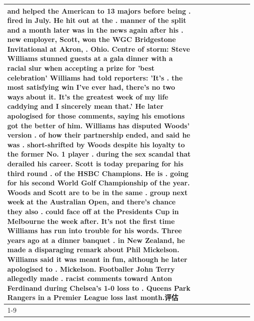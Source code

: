 \begin{table}[H]
\begin{tabular}{lllrlllll}
and helped the American to 13 majors before being . fired in July. He hit out at the . manner of the split and a month later was in the news again after his . new employer, Scott, won the WGC Bridgestone Invitational at Akron, . Ohio. Centre of storm: Steve Williams stunned guests at a gala dinner with a racial slur when accepting a prize for 'best celebration' Williams had told reporters: 'It's . the most satisfying win I've ever had, there's no two ways about it. It's the greatest week of my life caddying and I sincerely mean that.' He later apologised for those comments, saying his emotions got the better of him. Williams has disputed Woods' version . of how their partnership ended, and said he was . short-shrifted by Woods despite his loyalty to the former No. 1 player . during the sex scandal that derailed his career. Scott is today preparing for his third round . of the HSBC Champions. He is . going for his second World Golf Championship of the year. Woods and Scott are to be in the same . group next week at the Australian Open, and there's chance they also . could face off at the Presidents Cup in Melbourne the week after. It's not the first time Williams has run into trouble for his words. Three years ago at a dinner banquet . in New Zealand, he made a disparaging remark about Phil Mickelson. Williams said it was meant in fun, although he later apologised to . Mickelson. Footballer John Terry allegedly made . racist comments toward Anton Ferdinand during Chelsea's 1-0 loss to . Queens Park Rangers in a Premier League loss last month.评估 \\
\cline{1-9}

\end{tabular}
\end{table}
